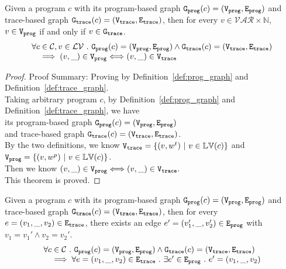 	\begin{lem}
	\label{lem:vertex_map}
	Given a program $c$ with its
	program-based graph $\mathtt{{G_{prog}}}({c}) = (\mathtt{{V_{prog}}}, \mathtt{{E_{prog}}})$
	and 
	trace-based graph $\mathtt{{G_{trace}}}({c}) = (\mathtt{{V_{trace}}}, \mathtt{{E_{trace}}})$,
	then for every $v \in \mathcal{VAR} \times \mathbb{N}$,
	$v \in \mathtt{{V_{prog}}}$ if and only if $v \in \mathtt{{G_{trace}}}$.
	\[
	\begin{array}{l}
	\forall c \in \mathcal{C} , v \in \mathcal{LV} ~.~  
	\mathtt{{G_{prog}}}({c}) = (\mathtt{{V_{prog}}}, \mathtt{{E_{prog}}})
	\land 
	\mathtt{{G_{trace}}}({c}) = (\mathtt{{V_{trace}}}, \mathtt{{E_{trace}}})
	\\ \quad
	\implies
	(v, \_) \in \mathtt{{V_{prog}}} \Longleftrightarrow (v, \_) \in \mathtt{{V_{trace}}}
	\end{array}
	\]
	\end{lem}
\begin{proof}
Proof Summary: Proving by Definition~\ref{def:prog_graph} and Definition~\ref{def:trace_graph}.
\\
Taking arbitrary program $c$,
by Definition~\ref{def:prog_graph} and Definition~\ref{def:trace_graph}, 
we have   
\\
its program-based graph $\mathtt{{G_{prog}}}({c}) = (\mathtt{{V_{prog}}}, \mathtt{{E_{prog}}})$ 
\\
and 
trace-based graph $\mathtt{{G_{trace}}}({c}) = (\mathtt{{V_{trace}}}, \mathtt{{E_{trace}}})$.
\\
By the two definitions, we know 
$\mathtt{{V_{trace}}}  = \{(v, w^t) ~|~ v \in \mathbb{LV}(c)\}$ and $\mathtt{{V_{prog}}} = \{(v, w^p) ~|~ v \in \mathbb{LV}(c)\}$.
\\
Then we know $(v, \_) \in \mathtt{{V_{prog}}} \Longleftrightarrow (v, \_) \in \mathtt{{V_{trace}}}$.
\\
This theorem is proved.
\end{proof}
%
	\begin{lem}
	\label{lem:edge_map}
	Given a program $c$ with its
	program-based graph $\mathtt{{G_{prog}}}({c}) = (\mathtt{{V_{prog}}}, \mathtt{{E_{prog}}})$
	and 
	trace-based graph $\mathtt{{G_{trace}}}({c}) = (\mathtt{{V_{trace}}}, \mathtt{{E_{trace}}})$,
	then for every $e = (v_1, \_, v_2) \in \mathtt{{E_{trace}}}$, there exists an edge 
	$e' = (v_1', \_, v_2') \in \mathtt{{E_{prog}}}$ with 
	$v_1 = v_1' \land v_2 = v_2'$.
	\[
	\begin{array}{l}
	\forall c \in \mathcal{C} ~.~ 
	 \mathtt{{G_{prog}}}({c}) = (\mathtt{{V_{prog}}}, \mathtt{{E_{prog}}})
	\land 
	\mathtt{{G_{trace}}}({c}) = (\mathtt{{V_{trace}}}, \mathtt{{E_{trace}}})
	\\ \quad
	\implies
	\forall e = (v_1, \_, v_2) \in \mathtt{{E_{trace}}}
	 ~.~  
	\exists e' \in \mathtt{{E_{prog}}} ~.~  e' = (v_1, \_, v_2)
	\end{array}
	\]
	\end{lem}
